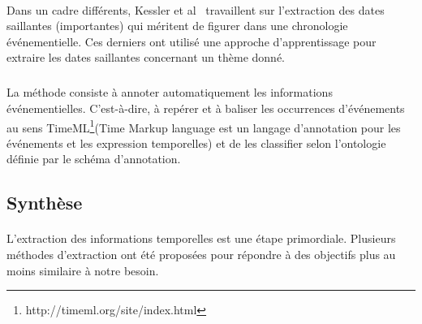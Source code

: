 \paragraph{}
Dans un cadre différents, Kessler et al~\cite{kessler2013} travaillent sur l'extraction des dates saillantes (importantes) qui méritent de figurer dans une chronologie événementielle.
Ces derniers ont utilisé une approche d’apprentissage pour extraire les dates saillantes concernant un thème donné.
\subparagraph{}
La méthode consiste à annoter automatiquement les informations événementielles. C’est-à-dire, à  repérer et à baliser les occurrences d’événements au sens TimeML\footnote{http://timeml.org/site/index.html}(Time Markup language est un langage d'annotation pour les événements et les expression temporelles) et de les classifier selon l’ontologie définie par le schéma d’annotation.
\subsection{Synthèse}
\paragraph{}
L'extraction des informations temporelles est une étape primordiale. Plusieurs méthodes d'extraction ont été proposées pour répondre à des objectifs plus au moins similaire à notre besoin.


